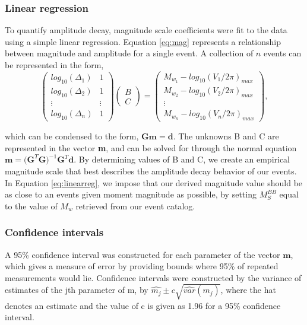 \documentclass{gji}
\begin{document}
\subsubsection{Linear regression}
To quantify amplitude decay, magnitude scale coefficients were fit to the data using a simple linear regression. Equation \ref{eq:mag} represents a relationship between magnitude and amplitude for a single event. A collection of $n$ events can be represented in the form, 
\begin{equation}
	\begin{pmatrix}
		log_{10}(\Delta_{1}) & 1 \\
		log_{10}(\Delta_{2}) & 1 \\
		\vdots  & \vdots \\
		log_{10}(\Delta_{n}) & 1 
	\end{pmatrix}
	\begin{pmatrix}
		{B}\\
		{C}
	\end{pmatrix}
	=
	\begin{pmatrix}
		M_{w_1} - log_{10}({V_1}/{2\pi})_{max} \\
		M_{w_2} - log_{10}({V_2}/{2\pi})_{max} \\
		\vdots  \\
		M_{w_n} - log_{10}({V_n}/{2\pi})_{max}
	\end{pmatrix},
	\label{eq:linearreg}
\end{equation}

\noindent which can be condensed to the form, $\mathbf{Gm = d}$. The unknowns B and C are represented in the vector {\bfseries m}, and can be solved for through the normal equation $\mathbf{m} = \mathbf{(G}^{T}\mathbf{G})^{-1}\mathbf{G}^T\mathbf{d}$.
By determining values of B and C, we create an empirical magnitude scale that best describes the amplitude decay behavior of our events. In Equation \ref{eq:linearreg}, we impose that our derived magnitude value should be as close to an events given moment magnitude as possible, by setting $M_S^{BB}$ equal to the value of $M_w$ retrieved from our event catalog. 

\subsubsection{Confidence intervals}
A 95\% confidence interval was constructed for each parameter of the vector $\mathbf{m}$, which gives a measure of error by providing bounds where 95\% of repeated measurements would lie. Confidence intervals were constructed by the variance of estimates of the jth parameter of m, by $\hat{m_j} \pm c \sqrt{\hat{var}(\hat{m_j})}$, where the hat denotes an estimate and the value of c is given as 1.96 for a 95\% confidence interval.
\end{document}
